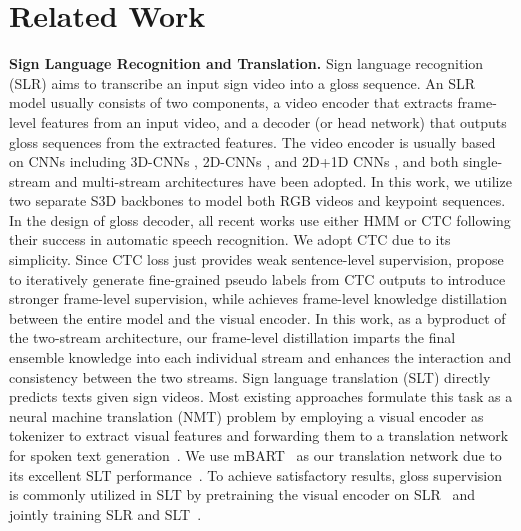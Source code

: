 \documentclass{article}
\begin{document}
 \section{Related Work}
\textbf{Sign Language Recognition and Translation.}
Sign language recognition (SLR) aims to transcribe an input sign video into a gloss sequence. An SLR model usually consists of two components, a video encoder that extracts frame-level features from an input video, and a decoder (or head network) that outputs gloss sequences from the extracted features.
The video encoder is usually based on CNNs including 3D-CNNs \cite{MMTLB_2022, Pu2019Iterative, li2020tspnet}, 2D-CNNs \cite{subunet_iccv2017, niu2020stochastic}, and 2D+1D CNNs \cite{STMC_MM, dnf_cui}, and both single-stream \cite{MMTLB_2022, Pu2019Iterative, li2020tspnet} and multi-stream architectures \cite{STMC_MM, dnf_cui, papadimitriou20_interspeech} have been adopted.
In this work, we utilize two separate S3D \cite{xie2018rethinking} backbones to model both RGB videos and keypoint sequences. In the design of gloss decoder, all recent works use either HMM \cite{koller2017re-sign, deep-sign, koller2019weak} or CTC \cite{fcn_eccv2020, STMC_MM, Min_2021_ICCV} following their success in automatic speech recognition. We adopt CTC due to its simplicity.
Since CTC loss just provides weak sentence-level supervision, 
\cite{dnf_cui, zhou2019dynamic} propose to iteratively generate fine-grained pseudo labels from CTC outputs to introduce stronger frame-level supervision, while \cite{Min_2021_ICCV} achieves frame-level knowledge distillation between the entire model and the visual encoder.
In this work, as a byproduct of the two-stream architecture, our frame-level distillation imparts the final ensemble knowledge into each individual stream and enhances the interaction and consistency between the two streams.
Sign language translation (SLT) directly predicts texts given sign videos. Most existing approaches formulate this task as a neural machine translation (NMT) problem by employing a visual encoder as tokenizer to extract visual features and forwarding them to a translation network for spoken text generation~\cite{MMTLB_2022,camgoz2020sign,li2020tspnet,zhou2021improving,Yin2020STMCTransf,camgoz2018neural}. We use mBART~\cite{liu2020multilingual} as our translation network due to its excellent SLT performance~\cite{MMTLB_2022}. To achieve satisfactory results, gloss supervision is commonly 
utilized in SLT by pretraining the visual encoder on SLR~\cite{camgoz2020sign,STMC_MM,zhou2021improving} and jointly training SLR and SLT~\cite{STMC_MM,camgoz2020sign}.
\end{document}
